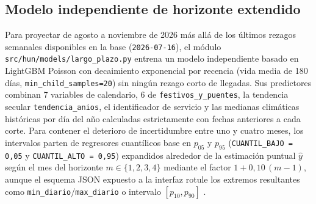 \subsection{Modelo independiente de horizonte extendido}

Para proyectar de agosto a noviembre de 2026 más allá de los últimos rezagos semanales disponibles en la base (\texttt{2026-07-16}), el módulo \texttt{src/hun/models/largo\_plazo.py} entrena un modelo independiente basado en LightGBM Poisson con decaimiento exponencial por recencia (vida media de 180 días, \texttt{min\_child\_samples=20}) sin ningún rezago corto de llegadas. Sus predictores combinan 7 variables de calendario, 6 de \texttt{festivos\_y\_puentes}, la tendencia secular \texttt{tendencia\_anios}, el identificador de servicio y las medianas climáticas históricas por día del año calculadas estrictamente con fechas anteriores a cada corte. Para contener el deterioro de incertidumbre entre uno y cuatro meses, los intervalos parten de regresores cuantílicos base en $p_{05}$ y $p_{95}$ (\texttt{CUANTIL\_BAJO = 0,05} y \texttt{CUANTIL\_ALTO = 0,95}) expandidos alrededor de la estimación puntual $\hat{y}$ según el mes del horizonte $m \in \{1,2,3,4\}$ mediante el factor $1 + 0{,}10\,(m - 1)$, aunque el esquema JSON expuesto a la interfaz rotule los extremos resultantes como \texttt{min\_diario}/\texttt{max\_diario} o intervalo $[p_{10}, p_{90}]$ \parencite{mediflow2026largoplazo}.
